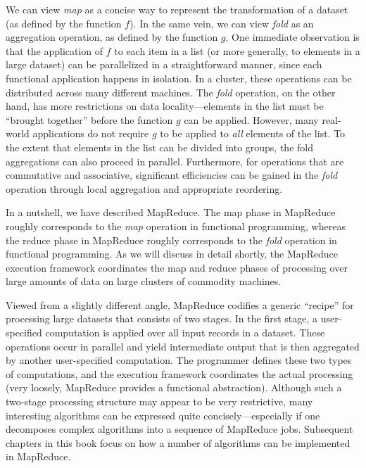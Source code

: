 \documentclass[11pt]{article}
\begin{document}
We can view \emph{map} as a concise way to represent the transformation
of a dataset (as defined by the function $f$).  In the same vein, we
can view \emph{fold} as an aggregation operation, as defined by the
function $g$.  One immediate observation is that the application of
$f$ to each item in a list (or more generally, to elements in a large
dataset) can be parallelized in a straightforward manner, since each
functional application happens in isolation.  In a cluster, these
operations can be distributed across many different machines.  The
\emph{fold} operation, on the other hand, has more restrictions on data
locality---elements in the list must be ``brought together'' before
the function $g$ can be applied.  However, many real-world
applications do not require $g$ to be applied to \emph{all} elements of
the list.  To the extent that elements in the list can be divided into
groups, the fold aggregations can also proceed in parallel.
Furthermore, for operations that are commutative and associative,
significant efficiencies can be gained in the \emph{fold} operation
through local aggregation and appropriate reordering.

In a nutshell, we have described MapReduce.  The map phase in
MapReduce roughly corresponds to the \emph{map} operation in functional
programming, whereas the reduce phase in MapReduce roughly corresponds
to the \emph{fold} operation in functional programming.  As we will
discuss in detail shortly, the MapReduce execution framework
coordinates the map and reduce phases of processing over large amounts
of data on large clusters of commodity machines.

Viewed from a slightly different angle, MapReduce codifies a generic
``recipe'' for processing large datasets that consists of two stages.
In the first stage, a user-specified computation is applied over all
input records in a dataset.  These operations occur in parallel and
yield intermediate output that is then aggregated by another
user-specified computation.  The programmer defines these two types of
computations, and the execution framework coordinates the actual
processing (very loosely, MapReduce provides a functional
abstraction).  Although such a two-stage processing structure may
appear to be very restrictive, many interesting algorithms can be
expressed quite concisely---especially if one decomposes complex
algorithms into a sequence of MapReduce jobs.  Subsequent chapters in
this book focus on how a number of algorithms can be implemented in
MapReduce.
\end{document}

